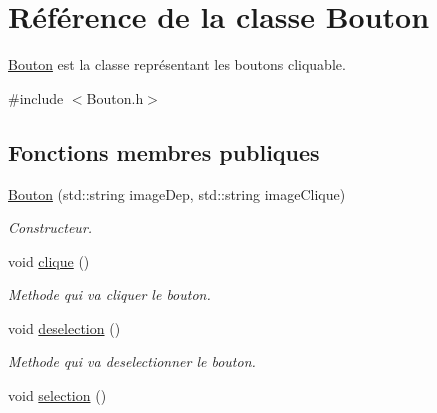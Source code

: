 \hypertarget{classBouton}{\section{\-Référence de la classe \-Bouton}
\label{classBouton}
}


\hyperlink{classBouton}{\-Bouton} est la classe représentant les boutons cliquable.  




{\ttfamily \#include $<$\-Bouton.\-h$>$}

\subsection*{\-Fonctions membres publiques}
\begin{DoxyCompactItemize}
\item 
\hyperlink{classBouton_af319327a914b558a9ea993cbe1a68757}{\-Bouton} (std\-::string image\-Dep, std\-::string image\-Clique)
\begin{DoxyCompactList}\small\item\em \-Constructeur. \end{DoxyCompactList}\item 
\hypertarget{classBouton_a7c7c9b6f21ca6346c61570612c1dc485}{void \hyperlink{classBouton_a7c7c9b6f21ca6346c61570612c1dc485}{clique} ()}\label{classBouton_a7c7c9b6f21ca6346c61570612c1dc485}

\begin{DoxyCompactList}\small\item\em \-Methode qui va cliquer le bouton. \end{DoxyCompactList}\item 
\hypertarget{classBouton_a71ecce6312b297811384722da8377d49}{void \hyperlink{classBouton_a71ecce6312b297811384722da8377d49}{deselection} ()}\label{classBouton_a71ecce6312b297811384722da8377d49}

\begin{DoxyCompactList}\small\item\em \-Methode qui va deselectionner le bouton. \end{DoxyCompactList}\item 
\hypertarget{classBouton_af9522cd8f1b62ba2df4a128c7dd68f65}{void \hyperlink{classBouton_af9522cd8f1b62ba2df4a128c7dd68f65}{selection} ()}\label{classBouton_af9522cd8f1b62ba2df4a128c7dd68f65}


\end{DoxyCompactItemize}
